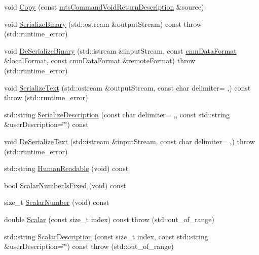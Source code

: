 \begin{DoxyCompactItemize}
\item 
void \hyperlink{classmts_command_void_return_description_aa8e1fda8aa28ae1b56b82132daf1e2d1}{Copy} (const \hyperlink{classmts_command_void_return_description}{mts\+Command\+Void\+Return\+Description} \&source)
\item 
void \hyperlink{classmts_command_void_return_description_a906b5f990278e13eb90c87aed7cb0b00}{Serialize\+Binary} (std\+::ostream \&output\+Stream) const   throw (std\+::runtime\+\_\+error)
\item 
void \hyperlink{classmts_command_void_return_description_a75600b5306b3cf1ee19659f5abc66f00}{De\+Serialize\+Binary} (std\+::istream \&input\+Stream, const \hyperlink{classcmn_data_format}{cmn\+Data\+Format} \&local\+Format, const \hyperlink{classcmn_data_format}{cmn\+Data\+Format} \&remote\+Format)  throw (std\+::runtime\+\_\+error)
\item 
void \hyperlink{classmts_command_void_return_description_a7390d3cca39ec23227cb3b6466489370}{Serialize\+Text} (std\+::ostream \&output\+Stream, const char delimiter= \textquotesingle{},\textquotesingle{}) const   throw (std\+::runtime\+\_\+error)
\item 
std\+::string \hyperlink{classmts_command_void_return_description_ab5806906f25a6ff7d6feab84fb9b00f4}{Serialize\+Description} (const char delimiter= \textquotesingle{},\textquotesingle{}, const std\+::string \&user\+Description=\char`\"{}\char`\"{}) const 
\item 
void \hyperlink{classmts_command_void_return_description_af144803a6870338eac1e82311059bfde}{De\+Serialize\+Text} (std\+::istream \&input\+Stream, const char delimiter= \textquotesingle{},\textquotesingle{})  throw (std\+::runtime\+\_\+error)
\item 
std\+::string \hyperlink{classmts_command_void_return_description_a18ccff4dea37ce553ae4c4fded18fc38}{Human\+Readable} (void) const 
\item 
bool \hyperlink{classmts_command_void_return_description_a239f27438fe00b4a4b21685ec68ec369}{Scalar\+Number\+Is\+Fixed} (void) const 
\item 
size\+\_\+t \hyperlink{classmts_command_void_return_description_a258065b7c6d92785dad5f16554d08ad3}{Scalar\+Number} (void) const 
\item 
double \hyperlink{classmts_command_void_return_description_abf19d8315a62011ac28ba6af3f66b416}{Scalar} (const size\+\_\+t index) const   throw (std\+::out\+\_\+of\+\_\+range)
\item 
std\+::string \hyperlink{classmts_command_void_return_description_af048def6322ce042f0ed0a44781a50b1}{Scalar\+Description} (const size\+\_\+t index, const std\+::string \&user\+Description=\char`\"{}\char`\"{}) const   throw (std\+::out\+\_\+of\+\_\+range)
\end{DoxyCompactItemize}
